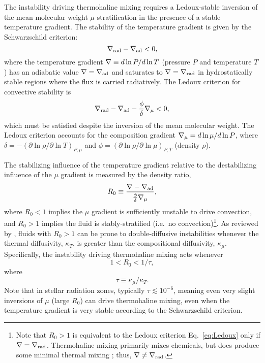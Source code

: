%
%
The instability driving thermohaline mixing requires a Ledoux-stable inversion of the mean molecular weight $\mu$ stratification in the presence of a stable temperature gradient. 
The stability of the temperature gradient is given by the Schwarzschild criterion:
\begin{equation} \label{eq:Schwarzschild}
    \gradrad - \gradad < 0,
\end{equation}
where the temperature gradient $\nabla \equiv d \ln P / d \ln T$ (pressure $P$ and temperature $T$) has an adiabatic value $\nabla = \nabla_{\rm{ad}}$ and saturates to $\nabla = \nabla_{\rm{rad}}$ in hydrostatically stable regions where the flux is carried radiatively. 
The Ledoux criterion for convective stability is \citep{Ledoux1947}
\begin{equation} \label{eq:Ledoux}
    \gradrad - \gradad - \frac{\phi}{\delta}\gradmu < 0,
\end{equation}
which must be satisfied despite the inversion of the mean molecular weight.
The Ledoux criterion accounts for the composition gradient $\nabla_{\mu} = d\ln\mu/d\ln P$, where $\delta = -(\partial \ln \rho / \partial \ln T)_{P,\mu}$ and $\phi = (\partial \ln \rho / \partial \ln\mu)_{P,T}$ (density $\rho$).

The stabilizing influence of the temperature gradient relative to the destabilizing influence of the $\mu$ gradient is measured by the density ratio,
\begin{equation} \label{eq:R0}
    R_0 \equiv \frac{\grad - \gradad}{\frac{\phi}{\delta} \gradmu},
\end{equation}
where $R_0 < 1$ implies the $\mu$ gradient is sufficiently unstable to drive convection, and $R_0 > 1$ implies the fluid is stably-stratified (i.e.~no convection)\footnote{Note that $R_0>1$ is equivalent to the Ledoux criterion Eq.~\eqref{eq:Ledoux} only if $\nabla = \nabla_{\rm{rad}}$. Thermohaline mixing primarily mixes chemicals, but does produce some minimal thermal mixing \citep[see, e.g., Fig.~4 of][]{brown_etal_2013}; thus, $\nabla \neq \nabla_{\rm{rad}}$.}. 
As reviewed by \citet{garaud_DDC_review_2018}, fluids with $R_0 > 1$ can be prone to double-diffusive instabilities whenever the thermal diffusivity, $\kappa_T$, is greater than the compositional diffusivity, $\kappa_\mu$. Specifically, the instability driving thermohaline mixing acts whenever
\begin{equation} \label{eq:R0_condition}
1 < R_0 < 1/\tau,
\end{equation}
\citep{baines_gill_1969} where
\begin{equation} \label{eq:tau}
    \tau \equiv \kappa_\mu/\kappa_T.
\end{equation}
Note that in stellar radiation zones, typically $\tau \lesssim 10^{-6}$, meaning even very slight inversions of $\mu$ (large $R_0$) can drive thermohaline mixing, even when the temperature gradient is very stable according to the Schwarzschild criterion.

